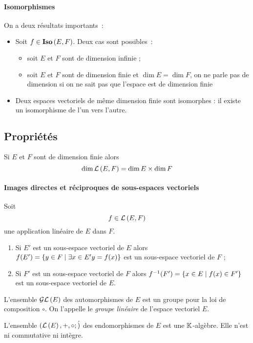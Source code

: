 \paragraph{Isomorphismes} 
On a deux résultats importants~: 
\begin{itemize} 
    \item Soit $f \in \mathbf{Iso}\left(E,F\right)$. Deux cas sont possibles~: 
    \begin{itemize} 
        \item soit $E$ et $F$ sont de dimension infinie ; 
        \item soit $E$ et $F$ sont de dimension finie et $\dim{E} = \dim{F}$, on
            ne parle pas de dimension si on ne sait pas que l'espace est de
            dimension finie
    \end{itemize} 
    \item Deux espaces vectoriels de même dimension finie sont isomorphes : il
        existe un isomorphisme de l'un vers l'autre.
\end{itemize}

\subsection{Propriétés} 
\begin{prop} 
    Si $E$ et $F$ sont de dimension finie alors
    \begin{equation}
        \dim\mathcal{L}\left(E,F\right)=\dim{E} \times \dim{F}
    \end{equation}
\end{prop}
%
\paragraph{Images directes et réciproques de sous-espaces vectoriels} 
\begin{prop}
    Soit \[f \in \mathcal{L}\left(E,F\right)\] une application linéaire de $E$ dans $F$.
    \begin{enumerate} 
        \item Si $E'$ est un sous-espace vectoriel de $E$ alors $f(E') =
        \left\{y \in F\mathrel{}\middle|\mathrel{}\exists x \in E' y=f(x)\right\}$ est un sous-espace vectoriel
            de $F$ ;
        \item Si $F'$ est un sous-espace vectoriel de $F$ alors $f^{-1}(F') =
            \left\{x \in E\mathrel{}\middle|\mathrel{}f(x) \in F'\right\}$ est un sous-espace vectoriel de $E$.
    \end{enumerate}
\end{prop}
%
\begin{prop} 
    L'ensemble $\mathcal{GL}\left(E\right)$ des automorphismes de $E$ est un groupe pour la loi de
    composition $\circ$. On l'appelle le \emph{groupe linéaire} de l'espace vectoriel $E$.  
\end{prop}
%
\begin{prop} 
    L'ensemble $(\mathcal{L}\left(E\right),+,\circ;\dot)$ des endomorphismes de $E$ est une
    $\mathbb{K}$-algèbre. Elle n'est ni commutative ni intègre.
\end{prop}
